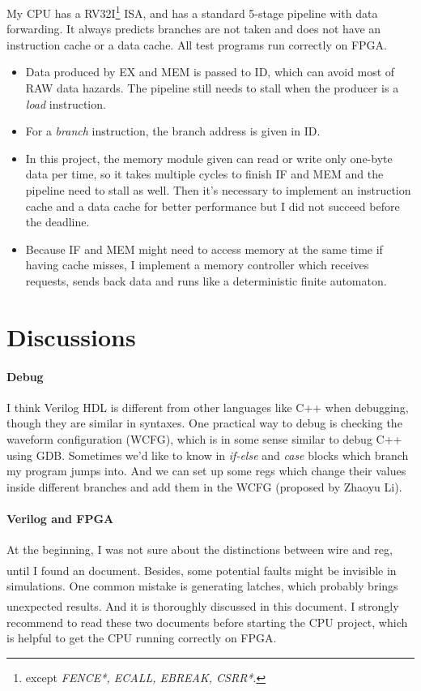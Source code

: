\documentclass[12pt, a4paper]{article}
\newcommand{\upcite}[1]{\textsuperscript{\textsuperscript{\cite{#1}}}}
\begin{document}
My CPU has a RV32I\footnote{except \textit{FENCE*, ECALL, EBREAK, CSRR*}.} ISA, and has a standard 5-stage pipeline with data forwarding. It always predicts branches are not taken and does not have an instruction cache or a data cache. All test programs run correctly on FPGA.

\begin{itemize}
	\item 
	Data produced by EX and MEM is passed to ID, which can avoid most of RAW data hazards. The pipeline still needs to stall when the producer is a \textit{load} instruction.
	\item 
	For a \textit{branch} instruction, the branch address is given in ID. 
	\item 
	In this project, the memory module given can read or write only one-byte data per time, so it takes multiple cycles to finish IF and MEM and the pipeline need to stall as well. Then it's necessary to implement an instruction cache and a data cache for better performance but I did not succeed before the deadline.
	\item 
	Because IF and MEM might need to access memory at the same time if having cache misses, I implement a memory controller which receives requests, sends back data and runs like a deterministic finite automaton.   
\end{itemize}

\section{Discussions}

\paragraph{Debug} 
I think Verilog HDL is different from other languages like C++ when debugging, though they are similar in syntaxes. One practical way to debug is checking the waveform configuration (WCFG), which is in some sense similar to debug C++ using GDB. Sometimes we'd like to know in \textit{if-else} and \textit{case} blocks which branch my program jumps into. And we can set up some regs which change their values inside different branches and add them in the WCFG (proposed by Zhaoyu Li).

\paragraph{Verilog and FPGA}
At the beginning, I was not sure about the distinctions between wire and reg, until I found an document.\upcite{wire and reg} Besides, some potential faults might be invisible in simulations. One common mistake is generating latches, which probably brings unexpected results. And it is thoroughly discussed in this document.\upcite{always} I strongly recommend to read these two documents before starting the CPU project, which is helpful to get the CPU running correctly on FPGA.
\end{document}
